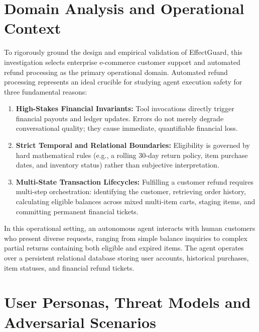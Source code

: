 \section{Domain Analysis and Operational Context}
\label{sec:req_domain}
To rigorously ground the design and empirical validation of EffectGuard, this investigation selects enterprise e-commerce customer support and automated refund processing as the primary operational domain. Automated refund processing represents an ideal crucible for studying agent execution safety for three fundamental reasons:
\begin{enumerate}
    \item \textbf{High-Stakes Financial Invariants:} Tool invocations directly trigger financial payouts and ledger updates. Errors do not merely degrade conversational quality; they cause immediate, quantifiable financial loss.
    \item \textbf{Strict Temporal and Relational Boundaries:} Eligibility is governed by hard mathematical rules (e.g., a rolling 30-day return policy, item purchase dates, and inventory status) rather than subjective interpretation.
    \item \textbf{Multi-State Transaction Lifecycles:} Fulfilling a customer refund requires multi-step orchestration: identifying the customer, retrieving order history, calculating eligible balances across mixed multi-item carts, staging items, and committing permanent financial tickets.
\end{enumerate}

In this operational setting, an autonomous agent interacts with human customers who present diverse requests, ranging from simple balance inquiries to complex partial returns containing both eligible and expired items. The agent operates over a persistent relational database storing user accounts, historical purchases, item statuses, and financial refund tickets.

\section{User Personas, Threat Models and Adversarial Scenarios}
\label{sec:req_personas_threat}

